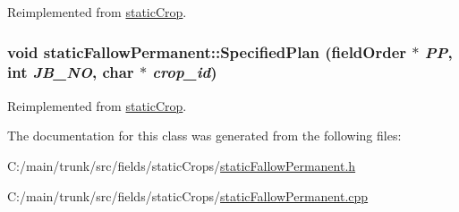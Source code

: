 Reimplemented from \hyperlink{classstatic_crop_a4d3d767f569f48eb68ffa76822302467}{staticCrop}.\hypertarget{classstatic_fallow_permanent_a1309e7e71b87b0264265c015250b0ea0}{
\subsubsection[{SpecifiedPlan}]{\setlength{\rightskip}{0pt plus 5cm}void staticFallowPermanent::SpecifiedPlan ({\bf fieldOrder} $\ast$ {\em PP}, \/  int {\em JB\_\-NO}, \/  char $\ast$ {\em crop\_\-id})}}
\label{classstatic_fallow_permanent_a1309e7e71b87b0264265c015250b0ea0}


Reimplemented from \hyperlink{classstatic_crop_af19d8a1e4f4833325f6712c22ede8b45}{staticCrop}.

The documentation for this class was generated from the following files:\begin{DoxyCompactItemize}
\item 
C:/main/trunk/src/fields/staticCrops/\hyperlink{static_fallow_permanent_8h}{staticFallowPermanent.h}\item 
C:/main/trunk/src/fields/staticCrops/\hyperlink{static_fallow_permanent_8cpp}{staticFallowPermanent.cpp}\end{DoxyCompactItemize}
